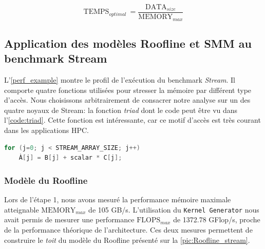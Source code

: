     \begin{equation}
        \text{TEMPS}_{optimal}\ = \frac{\text{DATA}_{size}}{\text{MEMORY}_{max}}
    \end{equation}





\subsection{Application des modèles Roofline et SMM au benchmark Stream}
    
    L'\autoref{perf_example} montre le profil de l'exécution du benchmark \textit{Stream}. Il comporte quatre fonctions utilisées pour stresser la mémoire par différent type d'accès. Nous choisissons arbitrairement de consacrer notre analyse sur un des quatre noyaux de Stream: la fonction \textit{triad} dont le code peut être vu dans l'\autoref{code:triad}. Cette fonction est intéressante, car ce motif d'accès est très courant dans les applications HPC.
    
    
\begin{lstlisting}[language=c,caption= La fonction triad du benchmark Stream utilise trois matrices: deux en lecture et une en écriture,label={code:triad}, 
  basicstyle=\footnotesize, frame=tb,
  xleftmargin=.065\textwidth, xrightmargin=.065\textwidth]
for (j=0; j < STREAM_ARRAY_SIZE; j++)
    À[j] = B[j] + scalar * C[j];
\end{lstlisting}
        
        
    
    \subsubsection{Modèle du Roofline}
        Lors de l'étape 1, nous avons mesuré la performance mémoire maximale atteignable $\text{MEMORY}_{max}$ de 105 GB/s. L'utilisation du \verb|Kernel Generator| nous avait permis de mesurer une performance $\text{FLOPS}_{max}$ de 1372.78 GFlop/s, proche de la performance théorique de l'architecture. Ces deux mesures permettent de construire le \textit{toit} du modèle du Roofline présenté sur la \autoref{pic:Roofline_stream}.
        

